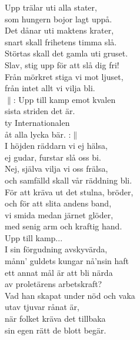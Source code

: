 \documentclass[a6paper,10pt]{article}
\begin{document}
\setlength{\oddsidemargin}{-0.47in}
\begin{center}
\end{center}
\begin{lyrics}
Upp trälar uti alla stater, \\
som hungern bojor lagt uppå. \\
Det dånar uti maktens krater, \\
snart skall frihetens timma slå. \\
Störtas skall det gamla uti gruset. \\
Slav, stig upp för att slå dig fri! \\
Från mörkret stiga vi mot ljuset, \\
från intet allt vi vilja bli. \\
\newline
$\|$: Upp till kamp emot kvalen \\
sista striden det är. \\
ty Internationalen \\
åt alla lycka bär. :$\|$\\
\newline
I höjden räddarn vi ej hälsa, \\
ej gudar, furstar slå oss bi. \\
Nej, själva vilja vi oss frälsa, \\
och samfälld skall vår räddning bli. \\
För att kräva ut det stulna, bröder, \\
och för att slita andens band, \\
vi smida medan järnet glöder, \\
med senig arm och kraftig hand.\\ 
\newline
Upp till kamp... \\
\newpage 
\setlength{\oddsidemargin}{-0.37in}
\noindent
I sin förgudning avskyvärda, \\
månn' guldets kungar nå'nsin haft \\
ett annat mål är att bli närda \\
av proletärens arbetskraft? \\
Vad han skapat under nöd och vaka \\
utav tjuvar rånat är, \\
när folket kräva det tillbaka \\
sin egen rätt de blott begär. \\
\newline

\end{lyrics}
\end{document}

